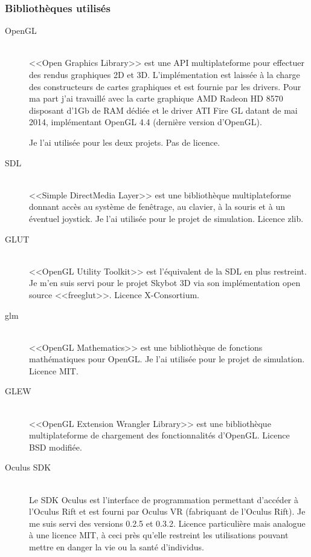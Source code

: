 \documentclass[a4paper,french,12pt]{article}
\begin{document}
		\subsubsection{Bibliothèques utilisés}

		  \begin{description}
		   \item [OpenGL] ~\\
		      <<Open Graphics Library>> est une API multiplateforme pour effectuer des rendus graphiques 2D et 3D.
		      L'implémentation est laissée à la charge des constructeurs de cartes graphiques et est fournie
		      par les drivers. Pour ma part j'ai travaillé avec la carte graphique AMD Radeon HD 8570 disposant d'1Gb de RAM dédiée  
		      et le driver ATI Fire GL datant de mai 2014, implémentant OpenGL 4.4 (dernière version d'OpenGL).
		      
		      Je l'ai utilisée pour les deux projets.
		      Pas de licence.
		      
		   \item [SDL]~\\
		      <<Simple DirectMedia Layer>> est une bibliothèque multiplateforme donnant accès au système de fenêtrage,
		      au clavier, à la souris et à un éventuel joystick. Je l'ai utilisée pour le projet de simulation.
		      Licence zlib.
		      
		   \item [GLUT]~\\
		      <<OpenGL Utility Toolkit>> est l'équivalent de la SDL en plus restreint. Je m'en suis servi pour le 
		      projet Skybot 3D via son implémentation open source <<freeglut>>.
		      Licence X-Consortium.
		      
		   \item [glm]~\\
		      <<OpenGL Mathematics>> est une bibliothèque de fonctions mathématiques pour OpenGL.
		      Je l'ai utilisée pour le projet de simulation.
		      Licence MIT.
		   
		   \item [GLEW]~\\
		      <<OpenGL Extension Wrangler Library>> est une bibliothèque multiplateforme de chargement des fonctionnalités d'OpenGL.
		      Licence BSD modifiée.
		      
		   \item [Oculus SDK]~\\
		      Le SDK Oculus est l'interface de programmation permettant d'accéder à l'Oculus Rift et est fourni
		      par Oculus VR (fabriquant de l'Oculus Rift). 
		      Je me suis servi des versions 0.2.5 et 0.3.2.
		      Licence particulière mais analogue à une licence MIT, à ceci près qu'elle restreint les utilisations
		      pouvant mettre en danger la vie ou la santé d'individus.
		      
		  \end{description}
\end{document}
